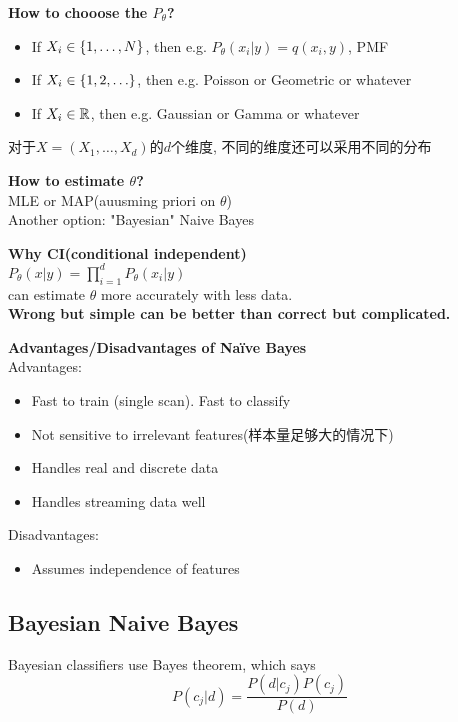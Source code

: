 \documentclass{article}
\begin{document}
\textbf{How to chooose the $P_\theta$?}
\begin{itemize}
\item If $X_i \in \{1,\ldots, N\}$, then e.g. $P_\theta(x_i |y) = q(x_i, y)$, PMF
\item If $X_i \in \{1, 2, \ldots\}$, then e.g. Poisson or Geometric or whatever
\item If $X_i \in \mathbb{R}$, then e.g. Gaussian or Gamma or whatever
\end{itemize}
对于$X=(X_1, \ldots, X_d)$的$d$个维度, 不同的维度还可以采用不同的分布

\textbf{How to estimate $\theta$?}\\
MLE or MAP(auusming priori on $\theta$)\\
Another option: "Bayesian" Naive Bayes

\textbf{Why CI(conditional independent)}\\
$P_\theta(x|y) = \prod_{i=1}^d P_\theta(x_i|y)$\\
can estimate $\theta$ more accurately with less data.\\
\textbf{Wrong but simple can be better than correct but complicated.}

\bigskip
\textbf{Advantages/Disadvantages of Na\"ive Bayes}\\
Advantages:
\begin{itemize}
\item Fast to train (single scan). Fast to classify 
\item Not sensitive to irrelevant features(样本量足够大的情况下)
\item Handles real and discrete data
\item Handles streaming data well
\end{itemize}

Disadvantages:
\begin{itemize}
\item Assumes independence of features
\end{itemize}

\subsection{Bayesian Naive Bayes}
Bayesian classifiers use Bayes theorem, which says
$$P(c_j|d) = \dfrac{P(d|c_j) P(c_j)}{P(d)}$$
\end{document}
